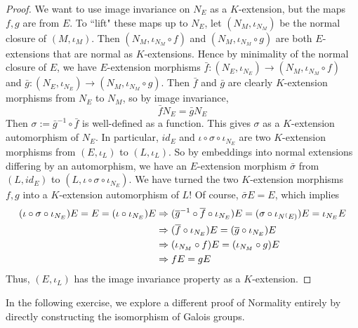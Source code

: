 \documentclass[../book.tex]{subfiles}
\begin{document}
\begin{proof}
        We want to use image invariance on $N_E$ as a $K$-extension,
        but the maps $f, g$ are from $E$. 
        To ``lift" these maps up to $N_E$, 
        let $(N_M,\iota_{N_M})$ be the normal closure of $(M,\iota_M)$. 
        Then $(N_M,\iota_{N_M}\circ f)$ and $(N_M,\iota_{N_M}\circ g)$
        are both $E$-extensions that are normal as $K$-extensions.
        Hence by minimality of the normal closure of $E$, 
        we have $E$-extension morphisms 
        $\bar{f} : (N_E,\iota_{N_E}) \to (N_M,\iota_{N_M}\circ f)$
        and $\bar{g} : (N_E,\iota_{N_E}) \to (N_M,\iota_{N_M}\circ g)$.
        Then $\bar{f}$ and $\bar{g}$ are clearly $K$-extension morphisms
        from $N_E$ to $N_M$,
        so by image invariance, \[ \bar{f} N_E = \bar{g} N_E \]
        Then $\sigma := \bar{g}^{-1} \circ \bar{f}$ is well-defined as a function.
        This gives $\sigma$ as a $K$-extension automorphism of $N_E$. 
        In particular, $id_E$ and $\iota\circ\sigma\circ\iota_{N_E}$ 
        are two $K$-extension morphisms from $(E,\iota_L)$ to $(L,\iota_L)$.
        So by embeddings into normal extensions differing by an automorphism, 
        we have an $E$-extension morphism $\bar{\sigma}$
        from $(L,id_E)$ to $(L,\iota\circ\sigma\circ\iota_{N_E})$.
        We have turned the two $K$-extension morphisms $f, g$ into 
        a $K$-extension automorphism of $L$!
        Of course, $\bar{\sigma} E = E$, which implies \begin{align*}
            (\iota\circ\sigma\circ\iota_{N_E}) E = E = (\iota\circ\iota_{N_E}) E &\Rightarrow
            (\overline{g}^{-1}\circ\overline{f}\circ\iota_{N_E}) E 
            = (\sigma\circ\iota_{N^(E)})E = \iota_{N_E} E \\
            &\Rightarrow (\overline{f}\circ\iota_{N_E}) E = (\overline{g}\circ\iota_{N_E}) E \\
            &\Rightarrow (\iota_{N_M}\circ f) E = (\iota_{N_M}\circ g) E \\
            &\Rightarrow f E = g E
        \end{align*}
        Thus, $(E,\iota_L)$ has the image invariance property as a $K$-extension. 
    
\end{proof}

In the following exercise, 
we explore a different proof of Normality 
entirely by directly constructing the isomorphism of Galois groups.
\end{document}
